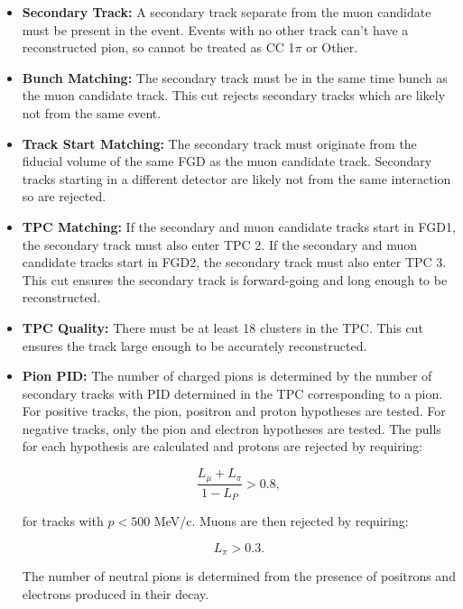 \begin{itemize}

\item \textbf{Secondary Track:} A secondary track separate from the muon candidate must be present in the event. Events with no other track can't have a reconstructed pion, so cannot be treated as CC 1$\pi$ or Other.

\item \textbf{Bunch Matching:} The secondary track must be in the same time bunch as the muon candidate track. This cut rejects secondary tracks which are likely not from the same event.

\item \textbf{Track Start Matching:} The secondary track must originate from the fiducial volume of the same FGD as the muon candidate track. Secondary tracks starting in a different detector are likely not from the same interaction so are rejected.

\item \textbf{TPC Matching:} If the secondary and muon candidate tracks start in FGD1, the secondary track must also enter TPC 2. If the secondary and muon candidate tracks start in FGD2, the secondary track must also enter TPC 3. This cut ensures the secondary track is forward-going and long enough to be reconstructed.

\item \textbf{TPC Quality:} There must be at least 18 clusters in the TPC. This cut ensures the track large enough to be accurately reconstructed.

\item \textbf{Pion PID:} The number of charged pions is determined by the number of secondary tracks with PID determined in the TPC corresponding to a pion. For positive tracks, the pion, positron and proton hypotheses are tested. For negative tracks, only the pion and electron hypotheses are tested. The pulls for each hypothesis are calculated and protons are rejected by requiring:

\begin{equation}
\frac{L_{\mu}+L_{\pi}}{1-L_P} > 0.8,
\end{equation}

for tracks with $p < 500$ MeV/c. Muons are then rejected by requiring:

\begin{equation}
L_{\pi} > 0.3.
\end{equation}

The number of neutral pions is determined from the presence of positrons and electrons produced in their decay.


\end{itemize}
